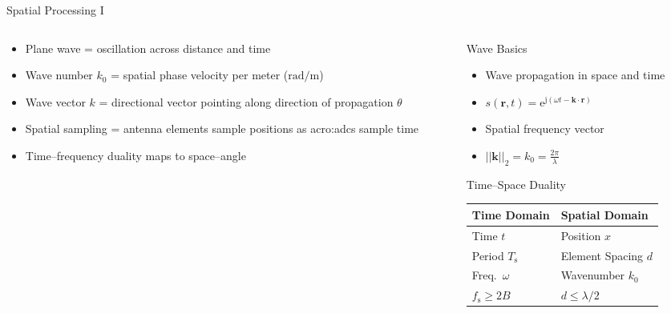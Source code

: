 \begin{frame}{Spatial Processing I}
  \begin{columns}[onlytextwidth]
    \begin{column}{0.48\textwidth}
      \begin{itemize}
        \item Plane wave = oscillation across distance and time
        \item Wave number $k_0$ = spatial phase velocity per meter ($\mathrm{rad/m}$)
        \item Wave vector $k$ = directional vector pointing along direction of propagation $\theta$
        \item Spatial sampling = antenna elements sample positions as \gls{acro:adc}s sample time
        \item Time--frequency duality maps to space--angle
      \end{itemize}
    \end{column}

    \begin{column}{0.48\textwidth}
      \begin{block}{Wave Basics}
        \begin{itemize}
          \item Wave propagation in space and time
          \item $s(\mathbf{r}, t) = \mathrm{e}^{\mathrm{j}(\omega t - \mathbf{k} \cdot \mathbf{r})}$
          \item Spatial frequency vector
          \item $||\mathbf{k}||_2 = k_0 = \frac{2 \pi}{\lambda}$
        \end{itemize}
      \end{block}

      \begin{block}{Time--Space Duality}
        \begin{tabular}{ll}
          \hline
          \textbf{Time Domain} & \textbf{Spatial Domain} \\
          \hline
          Time $t$ & Position $x$ \\
          Period $T_\mathrm{s}$ & Element Spacing $d$ \\
          Freq.\ $\omega$ & Wavenumber $k_0$ \\
          $f_\mathrm{s} \ge 2B$ & $d \le \lambda / 2$ \\
          \hline
        \end{tabular}
      \end{block}
    \end{column}
  \end{columns}
\end{frame}

